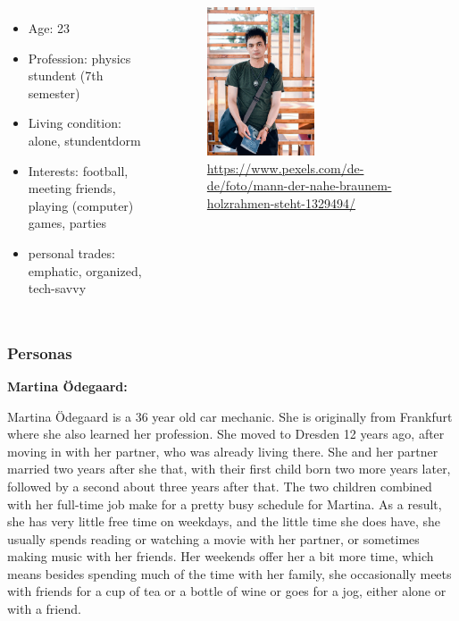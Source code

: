 \documentclass[aspectratio=169]{beamer}
\begin{document}
\begin{columns}
	\begin{itemize}
		\item Age: 23
		\item Profession: physics stundent (7th semester)
		\item Living condition: alone, stundentdorm
		\item Interests: football, meeting friends, playing (computer) games, parties
		\item personal trades: emphatic, organized, tech-savvy
	\end{itemize}
	 \begin{figure}
		 \centering
		\includegraphics[width=0.5\textwidth]{media/student.jpg}
		\caption{\url{https://www.pexels.com/de-de/foto/mann-der-nahe-braunem-holzrahmen-steht-1329494/}}
	\end{figure}
\end{columns}





\begin{frame}   
	\frametitle{Personas}{\textbf{Martina Ödegaard:}}

	Martina Ödegaard is a 36 year old car mechanic. She is originally from Frankfurt where she also learned her profession. She moved to Dresden 12 years ago, after moving in with her partner, who was already living there. She and her partner married 	two years after she that, with their first child born two more years later, followed by a second about three years after that. The two children combined with her full-time job make for a pretty busy schedule for Martina. As a result, she has very little free time on weekdays, and the little time she does have, she usually spends reading or watching a movie with her partner, or sometimes making music with her friends. Her weekends offer her a bit more time, which means besides spending much of the time with her family, she occasionally meets with friends for a cup of tea or a bottle of wine or goes for a jog, either alone or with a friend. 

\end{frame}
\end{document}
